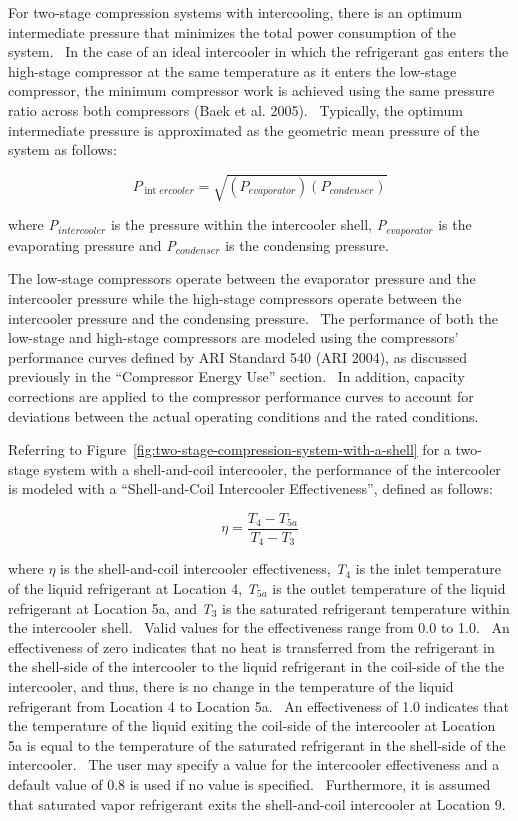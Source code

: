 For two-stage compression systems with intercooling, there is an optimum intermediate pressure that minimizes the total power consumption of the system.~ In the case of an ideal intercooler in which the refrigerant gas enters the high-stage compressor at the same temperature as it enters the low-stage compressor, the minimum compressor work is achieved using the same pressure ratio across both compressors (Baek et al. 2005).~ Typically, the optimum intermediate pressure is approximated as the geometric mean pressure of the system as follows:

\begin{equation}
{P_{{\mathop\mathrm{int}} ercooler}} = \sqrt {\left( {{P_{evaporator}}} \right)\left( {{P_{condenser}}} \right)}
\end{equation}

where \emph{P\(_{intercooler}\)} is the pressure within the intercooler shell, \emph{P\(_{evaporator}\)} is the evaporating pressure and \emph{P\(_{condenser}\)} is the condensing pressure.

The low-stage compressors operate between the evaporator pressure and the intercooler pressure while the high-stage compressors operate between the intercooler pressure and the condensing pressure.~ The performance of both the low-stage and high-stage compressors are modeled using the compressors' performance curves defined by ARI Standard 540 (ARI 2004), as discussed previously in the ``Compressor Energy Use'' section.~ In addition, capacity corrections are applied to the compressor performance curves to account for deviations between the actual operating conditions and the rated conditions.

Referring to Figure~\ref{fig:two-stage-compression-system-with-a-shell} for a two-stage system with a shell-and-coil intercooler, the performance of the intercooler is modeled with a ``Shell-and-Coil Intercooler Effectiveness'', defined as follows:

\begin{equation}
\eta  = \frac{{{T_4} - {T_{5a}}}}{{{T_4} - {T_3}}}
\end{equation}

where \(\eta\) is the shell-and-coil intercooler effectiveness, \emph{T}\(_{4}\) is the inlet temperature of the liquid refrigerant at Location 4, \emph{T}\(_{5a}\) is the outlet temperature of the liquid refrigerant at Location 5a, and \emph{T}\(_{3}\) is the saturated refrigerant temperature within the intercooler shell.~ Valid values for the effectiveness range from 0.0 to 1.0.~ An effectiveness of zero indicates that no heat is transferred from the refrigerant in the shell-side of the intercooler to the liquid refrigerant in the coil-side of the the intercooler, and thus, there is no change in the temperature of the liquid refrigerant from Location 4 to Location 5a.~ An effectiveness of 1.0 indicates that the temperature of the liquid exiting the coil-side of the intercooler at Location 5a is equal to the temperature of the saturated refrigerant in the shell-side of the intercooler.~ The user may specify a value for the intercooler effectiveness and a default value of 0.8 is used if no value is specified.~ Furthermore, it is assumed that saturated vapor refrigerant exits the shell-and-coil intercooler at Location 9.

